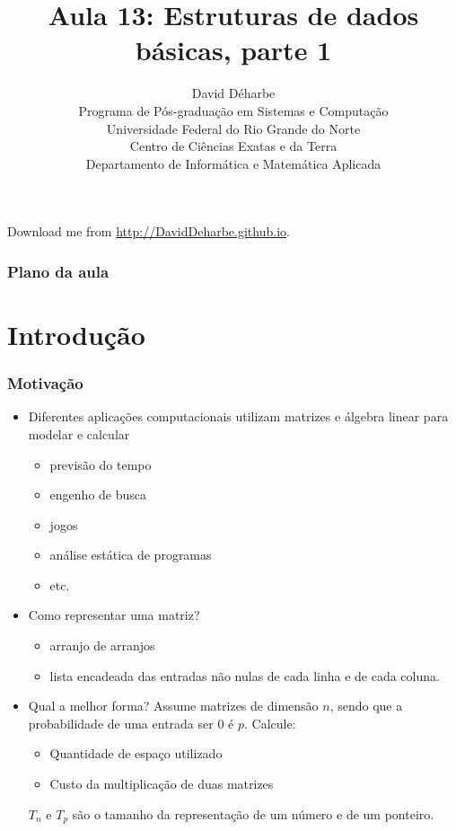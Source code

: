 \documentclass{beamer}
\title{Aula 13: Estruturas de dados básicas, parte 1}
\author{David Déharbe \\
  Programa de Pós-graduação em Sistemas e Computação \\
  Universidade Federal do Rio Grande do Norte \\
  Centro de Ciências Exatas e da Terra \\
  Departamento de Informática e Matemática Aplicada}
\date{}
\begin{document}
\begin{frame}
  \titlepage
  Download me from \url{http://DavidDeharbe.github.io}.
\end{frame}

\begin{frame}
  \frametitle{Plano da aula}
  \tableofcontents
\end{frame}

\section{Introdução}

\begin{frame}
  \frametitle{Motivação}

  \begin{itemize}
  \item Diferentes aplicações computacionais utilizam
    matrizes e álgebra linear para modelar e calcular
    \begin{itemize}
      \item previsão do tempo
      \item engenho de busca
      \item jogos
      \item análise estática de programas
      \item etc.
    \end{itemize}
  \item Como representar uma matriz?
    \pause
    \begin{itemize}
      \item \alert{arranjo de arranjos}
      \item \alert{lista encadeada} das entradas não nulas de cada linha e de
        cada coluna.
    \end{itemize}
  \item Qual a melhor forma?
    \pause
    Assume matrizes de dimensão $n$, sendo que a probabilidade de uma 
    entrada ser 0 é $p$. Calcule:
    \begin{itemize}
      \item Quantidade de espaço utilizado
      \item Custo da multiplicação de duas matrizes
    \end{itemize}
    $T_n$ e $T_p$ são o tamanho da representação de um número e
    de um ponteiro.
  \end{itemize}

\end{frame}
\end{document}
